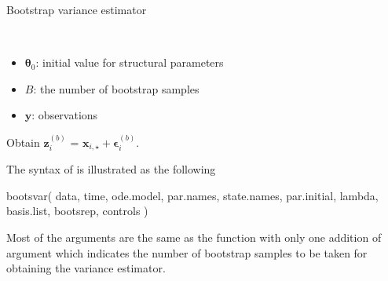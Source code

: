 \begin{algorithm}[H]
  \caption{Bootstrap variance estimator
    \label{alg:bootsvar}}
  \begin{algorithmic}
    \Require{}\\
    \begin{itemize}
      \item  $\bm{\theta}_{0}$: initial value for structural parameters
      \item  $B$: the number of bootstrap samples
      \item  $\bm{y}$: observations
      \end{itemize}

    \Statex
        
       
          
            \hspace*{1em}Obtain $\bm{z}_{i}^{(b)}$ = $\bm{x}_{i,\star}+\bm{\epsilon}_{i}^{(b)}$.      

          

      \EndFor
      \State {}
    \EndFunction
  \end{algorithmic}
\end{algorithm}
The syntax of  is illustrated as the following

\begin{example*}
bootsvar(
  data, time, ode.model, par.names, state.names, par.initial,
  lambda, basis.list, bootsrep, controls
)
\end{example*}

Most of the arguments are the same as the function  with only one addition of argument  which indicates the number of bootstrap samples to be taken for obtaining the variance estimator. 




